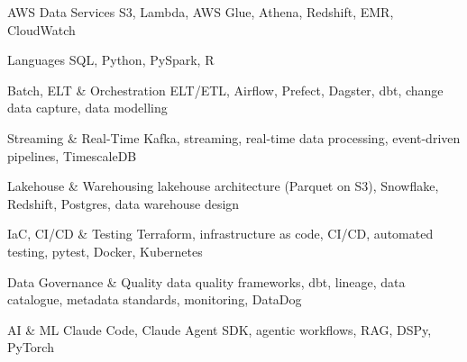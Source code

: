 
\begin{cvskills}

  \cvskill
    {AWS Data Services}
    {S3, Lambda, AWS Glue, Athena, Redshift, EMR, CloudWatch}

  \cvskill
    {Languages}
    {SQL, Python, PySpark, R}

  \cvskill
    {Batch, ELT \& Orchestration}
    {ELT/ETL, Airflow, Prefect, Dagster, dbt, change data capture, data modelling}

  \cvskill
    {Streaming \& Real-Time}
    {Kafka, streaming, real-time data processing, event-driven pipelines, TimescaleDB}

  \cvskill
    {Lakehouse \& Warehousing}
    {lakehouse architecture (Parquet on S3), Snowflake, Redshift, Postgres, data warehouse design}

  \cvskill
    {IaC, CI/CD \& Testing}
    {Terraform, infrastructure as code, CI/CD, automated testing, pytest, Docker, Kubernetes}

  \cvskill
    {Data Governance \& Quality}
    {data quality frameworks, dbt, lineage, data catalogue, metadata standards, monitoring, DataDog}

  \cvskill
    {AI \& ML}
    {Claude Code, Claude Agent SDK, agentic workflows, RAG, DSPy, PyTorch}

\end{cvskills}
